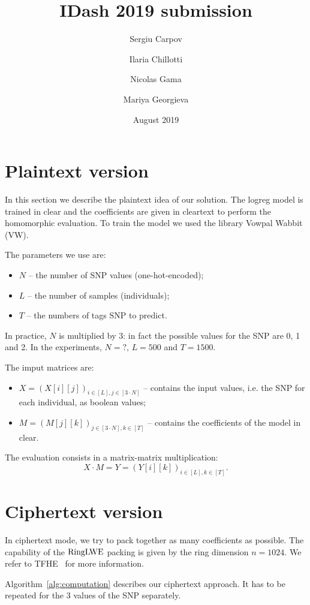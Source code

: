 \documentclass[a4paper]{article}
\title{IDash 2019 submission}
\author[1]{Sergiu Carpov}
\author[2]{Ilaria Chillotti}
\author[3]{Nicolas Gama}
\author[3]{Mariya Georgieva}
\affil[1]{CEA LIST, Point Courrier 172, 91191 Gif-sur-Yvette Cedex, France}
\affil[2]{imec-COSIC, KU Leuven, Leuven, Belgium}
\affil[3]{Inpher, Lausanne, Switzerland}
\date{August 2019}
\newcommand{\RingLWE}{\sc{\mathrm{RingLWE}}}
\begin{document}
\maketitle

\section{Plaintext version}

In this section we describe the plaintext idea of our solution.
The logreg model is trained in clear and the coefficients are given in cleartext to perform the homomorphic evaluation. 
To train the model we used the library Vowpal Wabbit (VW).

The parameters we use are:
\begin{itemize}
	\item $N$ -- the number of SNP values (one-hot-encoded);
	\item $L$ -- the number of samples (individuals);
	\item $T$ -- the numbers of tags SNP to predict.
\end{itemize}
In practice, $N$ is multiplied by 3: in fact the possible values for the SNP are 0, 1 and 2. 
In the experiments, $N = ?$, $L = 500$ and $T = 1500$.



The imput matrices are:
\begin{itemize}
	\item $X = (X[i][j])_{i\in [L], j\in [3\cdot N]}$ -- contains the input values, i.e. the SNP for each individual, as boolean values;
	\item $M = (M[j][k])_{j\in [3\cdot N], k\in [T]}$ -- contains the coefficients of the model in clear.
\end{itemize}
The evaluation consists in a matrix-matrix multiplication: 
$$
X \cdot M = Y = (Y[i][k])_{i\in [L], k\in [T]}.
$$ 







\section{Ciphertext version}

In ciphertext mode, we try to pack together as many coefficients as possible. 
The capability of the $\RingLWE$ packing is given by the ring dimension $n = 1024$.
We refer to TFHE~\cite{CGGI18} for more information.

Algorithm~\ref{alg:computation} describes our ciphertext approach. 
It has to be repeated for the 3 values of the SNP separately.
\end{document}
